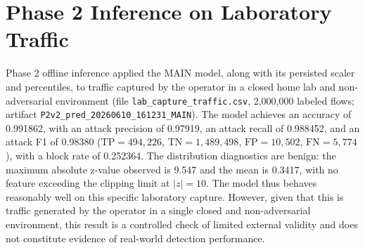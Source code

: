 \section{Phase 2 Inference on Laboratory Traffic}
\label{sec:phase2}
Phase 2 offline inference applied the MAIN model, along with its persisted scaler and percentiles, to traffic captured by the operator in a closed home lab and non-adversarial environment (file \texttt{lab\_capture\_traffic.csv}, 2,000,000 labeled flows; artifact \texttt{P2v2\_pred\_20260610\_161231\_MAIN}). The model achieves an accuracy of 0.991862, with an attack precision of 0.97919, an attack recall of 0.988452, and an attack F1 of 0.98380 ($\mathrm{TP}=494{,}226$, $\mathrm{TN}=1{,}489{,}498$, $\mathrm{FP}=10{,}502$, $\mathrm{FN}=5{,}774$), with a block rate of 0.252364. The distribution diagnostics are benign: the maximum absolute z-value observed is 9.547 and the mean is 0.3417, with no feature exceeding the clipping limit at $|z|=10$. The model thus behaves reasonably well on this specific laboratory capture. However, given that this is traffic generated by the operator in a single closed and non-adversarial environment, this result is a controlled check of limited external validity and does not constitute evidence of real-world detection performance.
